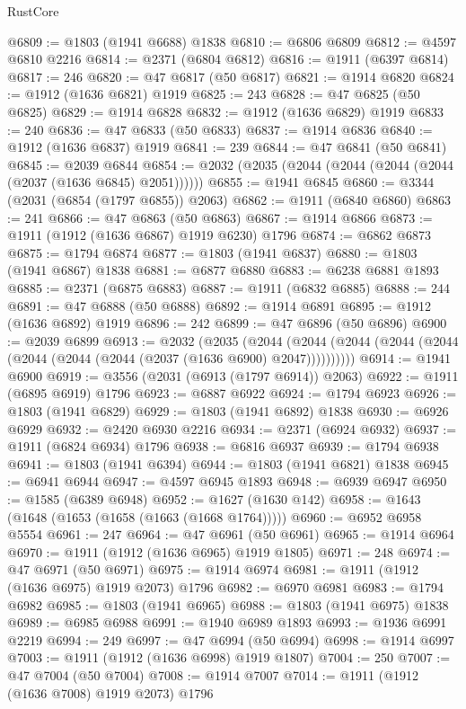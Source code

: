 \begin{lexlean}{RustCore}
\begin{coremodule}
@6809 := @1803 (@1941 @6688) @1838
@6810 := @6806 @6809
@6812 := @4597 @6810 @2216
@6814 := @2371 (@6804 @6812)
@6816 := @1911 (@6397 @6814)
@6817 := 246
@6820 := @47 @6817 (@50 @6817)
@6821 := @1914 @6820
@6824 := @1912 (@1636 @6821) @1919
@6825 := 243
@6828 := @47 @6825 (@50 @6825)
@6829 := @1914 @6828
@6832 := @1912 (@1636 @6829) @1919
@6833 := 240
@6836 := @47 @6833 (@50 @6833)
@6837 := @1914 @6836
@6840 := @1912 (@1636 @6837) @1919
@6841 := 239
@6844 := @47 @6841 (@50 @6841)
@6845 := @2039 @6844
@6854 := @2032 (@2035 (@2044 (@2044 (@2044 (@2044 (@2037 (@1636 @6845) @2051))))))
@6855 := @1941 @6845
@6860 := @3344 (@2031 (@6854 (@1797 @6855)) @2063)
@6862 := @1911 (@6840 @6860)
@6863 := 241
@6866 := @47 @6863 (@50 @6863)
@6867 := @1914 @6866
@6873 := @1911 (@1912 (@1636 @6867) @1919 @6230) @1796
@6874 := @6862 @6873
@6875 := @1794 @6874
@6877 := @1803 (@1941 @6837)
@6880 := @1803 (@1941 @6867) @1838
@6881 := @6877 @6880
@6883 := @6238 @6881 @1893
@6885 := @2371 (@6875 @6883)
@6887 := @1911 (@6832 @6885)
@6888 := 244
@6891 := @47 @6888 (@50 @6888)
@6892 := @1914 @6891
@6895 := @1912 (@1636 @6892) @1919
@6896 := 242
@6899 := @47 @6896 (@50 @6896)
@6900 := @2039 @6899
@6913 := @2032
    (@2035
      (@2044 (@2044 (@2044 (@2044 (@2044 (@2044 (@2044 (@2044 (@2037 (@1636 @6900) @2047))))))))))
@6914 := @1941 @6900
@6919 := @3556 (@2031 (@6913 (@1797 @6914)) @2063)
@6922 := @1911 (@6895 @6919) @1796
@6923 := @6887 @6922
@6924 := @1794 @6923
@6926 := @1803 (@1941 @6829)
@6929 := @1803 (@1941 @6892) @1838
@6930 := @6926 @6929
@6932 := @2420 @6930 @2216
@6934 := @2371 (@6924 @6932)
@6937 := @1911 (@6824 @6934) @1796
@6938 := @6816 @6937
@6939 := @1794 @6938
@6941 := @1803 (@1941 @6394)
@6944 := @1803 (@1941 @6821) @1838
@6945 := @6941 @6944
@6947 := @4597 @6945 @1893
@6948 := @6939 @6947
@6950 := @1585 (@6389 @6948)
@6952 := @1627 (@1630 @142)
@6958 := @1643 (@1648 (@1653 (@1658 (@1663 (@1668 @1764)))))
@6960 := @6952 @6958 @5554
@6961 := 247
@6964 := @47 @6961 (@50 @6961)
@6965 := @1914 @6964
@6970 := @1911 (@1912 (@1636 @6965) @1919 @1805)
@6971 := 248
@6974 := @47 @6971 (@50 @6971)
@6975 := @1914 @6974
@6981 := @1911 (@1912 (@1636 @6975) @1919 @2073) @1796
@6982 := @6970 @6981
@6983 := @1794 @6982
@6985 := @1803 (@1941 @6965)
@6988 := @1803 (@1941 @6975) @1838
@6989 := @6985 @6988
@6991 := @1940 @6989 @1893
@6993 := @1936 @6991 @2219
@6994 := 249
@6997 := @47 @6994 (@50 @6994)
@6998 := @1914 @6997
@7003 := @1911 (@1912 (@1636 @6998) @1919 @1807)
@7004 := 250
@7007 := @47 @7004 (@50 @7004)
@7008 := @1914 @7007
@7014 := @1911 (@1912 (@1636 @7008) @1919 @2073) @1796

\end{coremodule}
\end{lexlean}

